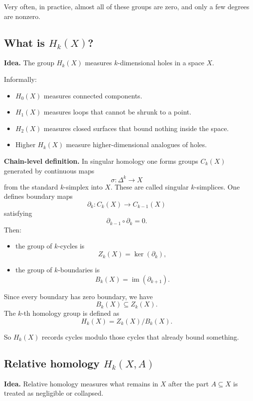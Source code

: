 \documentclass[12pt,a4paper]{article}
\theoremstyle{notespace}
\begin{document}
Very often, in practice, almost all of these groups are zero, and only a few degrees are nonzero.

\subsection{What is \(H_k(X)\)?}

\textbf{Idea.}
The group \(H_k(X)\) measures \(k\)-dimensional holes in a space \(X\).

Informally:
\begin{itemize}
	\item \(H_0(X)\) measures connected components.
	\item \(H_1(X)\) measures loops that cannot be shrunk to a point.
	\item \(H_2(X)\) measures closed surfaces that bound nothing inside the space.
	\item Higher \(H_k(X)\) measure higher-dimensional analogues of holes.
\end{itemize}

\textbf{Chain-level definition.}
In singular homology one forms groups \(C_k(X)\) generated by continuous maps
\[
\sigma:\Delta^k\to X
\]
from the standard \(k\)-simplex into \(X\). These are called singular \(k\)-simplices. One defines boundary maps
\[
\partial_k:C_k(X)\to C_{k-1}(X)
\]
satisfying
\[
\partial_{k-1}\circ \partial_k = 0.
\]
Then:

\begin{itemize}
	\item the group of \(k\)-cycles is
	\[
	Z_k(X)=\ker(\partial_k),
	\]
	\item the group of \(k\)-boundaries is
	\[
	B_k(X)=\operatorname{im}(\partial_{k+1}).
	\]
\end{itemize}

Since every boundary has zero boundary, we have
\[
B_k(X)\subseteq Z_k(X).
\]
The \(k\)-th homology group is defined as
\[
H_k(X)=Z_k(X)/B_k(X).
\]

So \(H_k(X)\) records cycles modulo those cycles that already bound something.

\subsection{Relative homology \(H_k(X,A)\)}

\textbf{Idea.}
Relative homology measures what remains in \(X\) after the part \(A\subseteq X\) is treated as negligible or collapsed.
\end{document}

